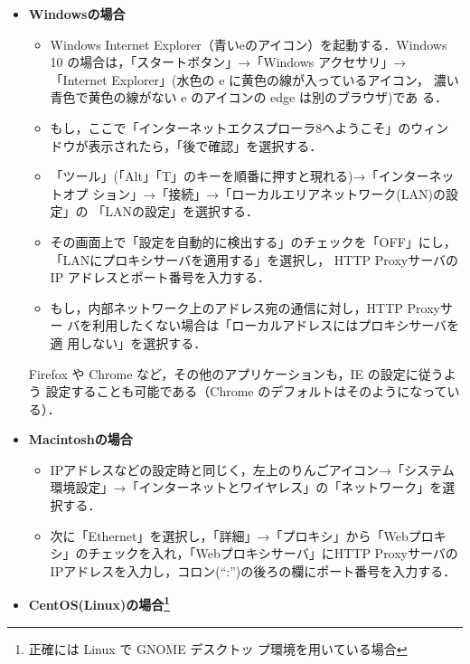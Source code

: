 \begin{itemize}
\item{\bf Windowsの場合}\\

\begin{itemize}
 \item  Windows Internet Explorer（青いeのアイコン）を起動する．Windows
	10 の場合は，「スタートボタン」→「Windows アクセサリ」→
	「Internet Explorer」(水色の e に黄色の線が入っているアイコン，
	濃い青色で黄色の線がない e のアイコンの edge は別のブラウザ)であ
	る．
 \item  もし，ここで「インターネットエクスプローラ8へようこそ」のウィン
	ドウが表示されたら，「後で確認」を選択する．
 \item 「ツール」(「Alt」「T」のキーを順番に押すと現れる)→「インターネットオプ
	ション」→「接続」→「ローカルエリアネットワーク(LAN)の設定」の
	「LANの設定」を選択する．
 \item その画面上で「設定を自動的に検出する」のチェックを「OFF」にし，
	「LANにプロキシサーバを適用する」を選択し， HTTP ProxyサーバのIP
	アドレスとポート番号を入力する．
 \item もし，内部ネットワーク上のアドレス宛の通信に対し，HTTP Proxyサー
	バを利用したくない場合は「ローカルアドレスにはプロキシサーバを適
	用しない」を選択する．
\end{itemize}

Firefox や Chrome など，その他のアプリケーションも，IE の設定に従うよう
設定することも可能である（Chrome のデフォルトはそのようになっている）．

\item{\bf Macintoshの場合}\\
\begin{itemize}
 \item  IPアドレスなどの設定時と同じく，左上のりんごアイコン→「システム
	環境設定」→「インターネットとワイヤレス」の「ネットワーク」を選
	択する．
 \item  次に「Ethernet」を選択し，「詳細」→「プロキシ」から「Webプロキシ」のチェックを入れ，「Webプロキシサーバ」にHTTP ProxyサーバのIPアドレスを入力し，コロン(``:'')の後ろの欄にポート番号を入力する．
\end{itemize}

\item{\bf CentOS(Linux)の場合\footnote{正確には Linux で GNOME デスクトッ
     プ環境を用いている場合}}\\


\end{itemize}
